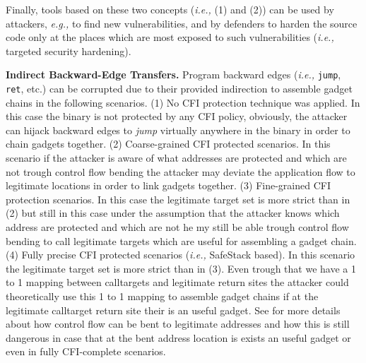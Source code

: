 Finally, tools based on these two concepts (\textit{i.e.,} (1) and (2)) can be used by attackers, \textit{e.g.,} to find new vulnerabilities, and by defenders
to harden the source code only at the places which are most exposed to such vulnerabilities (\textit{i.e.,} targeted security hardening).

\textbf{Indirect Backward-Edge Transfers.} 
Program backward edges (\textit{i.e.,} \texttt{jump}, \texttt{ret}, etc.) can be corrupted due to their provided indirection to assemble gadget chains in the following scenarios.
(1) No CFI protection technique was applied. In this case the binary is not protected by any CFI policy, obviously, the attacker can hijack backward edges to \textit{jump} virtually 
anywhere in the binary in order to chain gadgets together.
(2) Coarse-grained CFI protected scenarios. In this scenario if the attacker is aware of what addresses are protected and which are not trough control flow bending the attacker may deviate
the application flow to legitimate locations in order to link gadgets together.
(3) Fine-grained CFI protection scenarios. In this case the legitimate target set is more strict than in (2) but still in this case under the assumption that the attacker knows
which address are protected and which are not he my still be able trough control flow bending to call legitimate targets which are useful for assembling a gadget chain.
(4) Fully precise CFI protected scenarios (\textit{i.e.,} SafeStack \cite{volodymyr:cpi} based). In this scenario the legitimate target set is more strict than in (3). Even trough that we have a 1 to 1 mapping 
between calltargets and legitimate return sites the attacker could theoretically use this 1 to 1 mapping to assemble gadget chains if at the legitimate calltarget return site their is an useful gadget. 
See \cite{carlini:bending} for more details about how control flow can be bent to legitimate addresses and how this is still dangerous in 
case that at the bent address location is exists an useful gadget or even in fully CFI-complete scenarios. 

